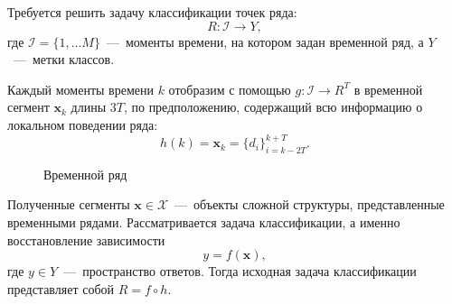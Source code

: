 \documentclass[12pt, twoside]{article}
\begin{document}
Требуется решить задачу классификации точек ряда: $$R:\mathcal{I}\rightarrow Y,$$ где $\mathcal{I}=\{1,\ldots M\}$~---~моменты времени, на котором задан временной ряд, а $Y$~---~метки классов.

Каждый моменты времени $k$ отобразим с помощью $g:\mathcal{I}\rightarrow R^T$ в временной сегмент $\mathbf{x}_k$ длины $3T$, по предположению, содержащий всю информацию о локальном поведении ряда:
\begin{equation}\label{eq1}
h(k) = \mathbf{x}_k = \{d_i\}_{i=k-2T}^{k+T}.
\end{equation}

\begin{figure}[H]
\caption{ Временной ряд}
\label{fig:image}
\end{figure}


Полученные сегменты $\mathbf{x} \in \mathcal{X}$~---~объекты сложной структуры, представленные временными рядами. Рассматривается задача классификации, а именно восстановление зависимости $$y=f(\mathbf{x}),$$ где $y\in Y$~---~пространство ответов. Тогда исходная задача классификации представляет собой $R=f\circ h$.
\end{document}
